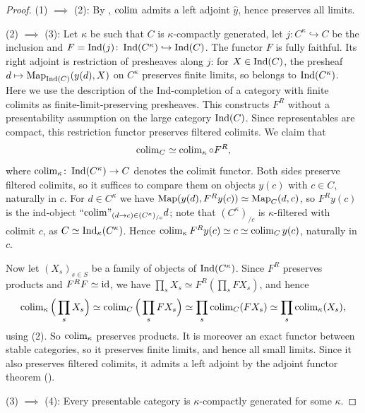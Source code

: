 	\begin{proof}
		(1) $\implies$ (2): By , $\operatorname{colim}$ admits a left adjoint $\hat{y}$, hence preserves all limits.

		(2) $\implies$ (3): Let $\kappa$ be such that $C$ is $\kappa$-compactly generated, let $j\colon C^{\kappa} \hookrightarrow C$ be the inclusion and $F = \operatorname{Ind}(j)\colon \operatorname{Ind}(C^{\kappa}) \hookrightarrow \operatorname{Ind}(C)$. The functor $F$ is fully faithful. Its right adjoint is restriction of presheaves along $j$: for $X \in \operatorname{Ind}(C)$, the presheaf $d \mapsto \operatorname{Map}_{\operatorname{Ind}(C)}(y(d),X)$ on $C^{\kappa}$ preserves finite limits, so belongs to $\operatorname{Ind}(C^{\kappa})$. Here we use the description of the Ind-completion of a category with finite colimits as finite-limit-preserving presheaves. This constructs $F^R$ without a presentability assumption on the large category $\operatorname{Ind}(C)$. Since representables are compact, this restriction functor preserves filtered colimits. We claim that
		\[
			\operatorname{colim}_C \simeq \operatorname{colim}_{\kappa} \circ F^R,
		\]
		where $\operatorname{colim}_{\kappa}\colon \operatorname{Ind}(C^{\kappa}) \to C$ denotes the colimit functor. Both sides preserve filtered colimits, so it suffices to compare them on objects $y(c)$ with $c \in C$, naturally in $c$. For $d \in C^{\kappa}$ we have $\operatorname{Map}(y(d),F^Ry(c)) \simeq \operatorname{Map}_C(d,c)$, so $F^Ry(c)$ is the ind-object $\text{``}\!\operatorname{colim}\!\text{''}_{(d \to c) \in (C^{\kappa})_{/c}} d$; note that $(C^{\kappa})_{/c}$ is $\kappa$-filtered with colimit $c$, as $C \simeq \operatorname{Ind}_{\kappa}(C^{\kappa})$. Hence $\operatorname{colim}_{\kappa}F^Ry(c) \simeq c \simeq \operatorname{colim}_C y(c)$, naturally in $c$.

		Now let $(X_s)_{s \in S}$ be a family of objects of $\operatorname{Ind}(C^{\kappa})$. Since $F^R$ preserves products and $F^RF \simeq \operatorname{id}$, we have $\prod_s X_s \simeq F^R(\prod_s FX_s)$, and hence
		\[
			\operatorname{colim}_{\kappa}\Big(\prod_s X_s\Big) \simeq \operatorname{colim}_C\Big(\prod_s FX_s\Big) \simeq \prod_s \operatorname{colim}_C(FX_s) \simeq \prod_s \operatorname{colim}_{\kappa}(X_s),
		\]
		using (2). So $\operatorname{colim}_{\kappa}$ preserves products. It is moreover an exact functor between stable categories, so it preserves finite limits, and hence all small limits. Since it also preserves filtered colimits, it admits a left adjoint by the adjoint functor theorem ().

		(3) $\implies$ (4): Every presentable category is $\kappa$-compactly generated for some $\kappa$.


\end{proof}
